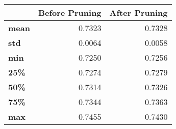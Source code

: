 \begin{tabular}{lrr}
\toprule
{} &  Before Pruning &  After Pruning \\
\midrule
\textbf{mean} &          0.7323 &         0.7328 \\
\textbf{std } &          0.0064 &         0.0058 \\
\textbf{min } &          0.7250 &         0.7256 \\
\textbf{25\% } &          0.7274 &         0.7279 \\
\textbf{50\% } &          0.7314 &         0.7326 \\
\textbf{75\% } &          0.7344 &         0.7363 \\
\textbf{max } &          0.7455 &         0.7430 \\
\bottomrule
\end{tabular}
